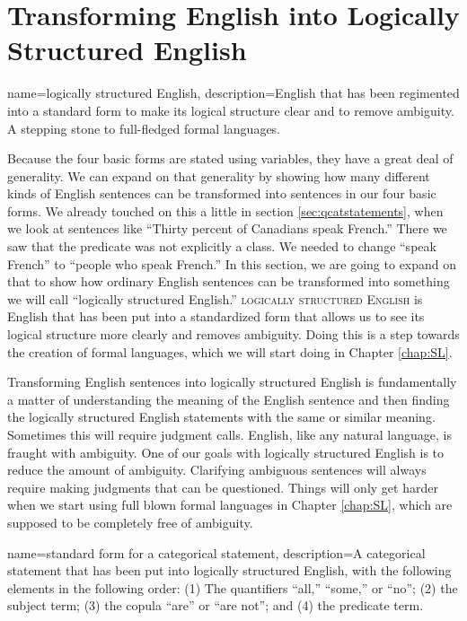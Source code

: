 \section{Transforming English into Logically Structured English} \label{sec:transformation} 

{
name=logically structured English,
description={English that has been regimented into a standard form to make its logical structure clear and to remove ambiguity. A stepping stone to full-fledged formal languages.}
}

Because the four basic forms are stated using variables, they have a great deal of generality. We can expand on that generality by showing how many different kinds of English sentences can be transformed into sentences in our four basic forms. We already touched on this a little in section \ref{sec:qcatstatements}, when we look at sentences like ``Thirty percent of Canadians speak French.'' There we saw that the predicate was not explicitly a class. We needed to change ``speak French'' to ``people who speak French.'' In this section, we are going to expand on that to show how ordinary English sentences can be transformed into something we will call ``logically structured English.'' \textsc{\gls{logically structured English}} \label{def:LSE} is English that has been put into a standardized form that allows us to see its logical structure more clearly and removes ambiguity.  Doing this is a step towards the creation of formal languages, which we will start doing in Chapter \ref{chap:SL}. 

Transforming English sentences into logically structured English is fundamentally a matter of understanding the meaning of the English sentence and then finding the logically structured English statements with the same or similar meaning. Sometimes this will require judgment calls. English, like any natural  language, is fraught with ambiguity. One of our goals with logically structured English is to reduce the amount of ambiguity. Clarifying ambiguous sentences will always require making judgments that can be questioned. Things will only get harder when we start using full blown formal languages in Chapter \ref{chap:SL}, which are supposed to be completely free of ambiguity.

{
name=standard form for a categorical statement,
description={A categorical statement that has been put into logically structured English, with the following elements in the following order: (1) The quantifiers ``all,'' ``some,'' or ``no''; (2) the subject term; (3) the copula ``are'' or ``are not''; and (4) the predicate term.}
}


